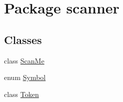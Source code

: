 \hypertarget{namespacescanner}{}\section{Package scanner}
\label{namespacescanner}
\subsection*{Classes}
\begin{DoxyCompactItemize}
\item 
class \hyperlink{classscanner_1_1ScanMe}{Scan\+Me}
\item 
enum \hyperlink{enumscanner_1_1Symbol}{Symbol}
\item 
class \hyperlink{classscanner_1_1Token}{Token}
\end{DoxyCompactItemize}
